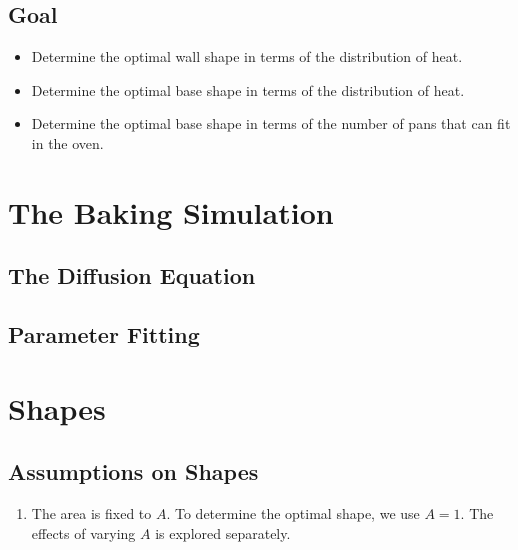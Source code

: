 \documentclass[12pt]{reedmcm}
\begin{document}
\subsection{Goal}
\begin{itemize}
  \item Determine the optimal wall shape in terms of the distribution of heat.
  \item Determine the optimal base shape in terms of the distribution of heat.
  \item Determine the optimal base shape in terms of the number of pans that can fit in the oven.
\end{itemize}

\section{The Baking Simulation}
\subsection{The Diffusion Equation}
\subsection{Parameter Fitting}

\section{Shapes}
\subsection{Assumptions on Shapes}
\begin{enumerate}
  \item The area is fixed to $A$. To determine the optimal shape, we use $A=1$. The effects of varying $A$ is explored separately.
\end{enumerate}
\end{document}
